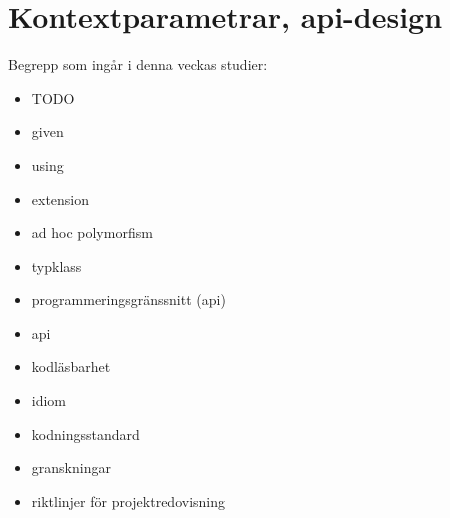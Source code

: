 \chapter{Kontextparametrar, api-design}\label{chapter:W11}
Begrepp som ingår i denna veckas studier:
\begin{itemize}[noitemsep,label={$\square$},leftmargin=*]
\item TODO
\item given
\item using
\item extension
\item ad hoc polymorfism
\item typklass
\item programmeringsgränssnitt (api)
\item api
\item kodläsbarhet
\item idiom
\item kodningsstandard
\item granskningar
\item riktlinjer för projektredovisning\end{itemize}
